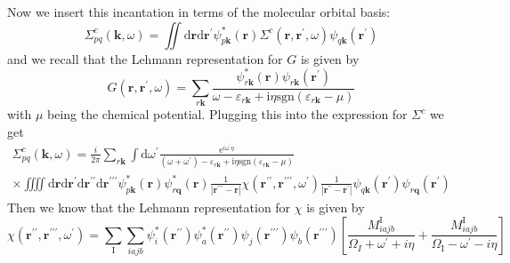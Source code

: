 \documentclass[12pt]{article}
\begin{document}
Now we insert this incantation in terms of the molecular orbital basis:
\begin{equation}
    \Sigma _{p q}^c\left(\mathbf{k}, \omega\right)= \iint \mathrm{d} \mathbf{r} \mathrm{d} \mathbf{r}^{\prime} \psi_{p\mathbf{k}}^{*}(\mathbf{r}) \Sigma^c\left(\mathbf{r}, \mathbf{r}^{\prime}, \omega\right) \psi_{q\mathbf{k}}(\mathbf{r}^{\prime})
\end{equation}
and we recall that the Lehmann representation for $G$ is given by
\begin{equation}
    G\left(\mathbf{r}, \mathbf{r}^{\prime}, \omega\right) = \sum_{r\mathbf{k}} \frac{\psi_{r\mathbf{k}}^{*}(\mathbf{r}) \psi_{r\mathbf{k}}(\mathbf{r}^{\prime})}{\omega - \varepsilon_{r\mathbf{k}} + \mathrm{i}\eta\text{sgn}(\varepsilon_{r\mathbf{k}} - \mu)}
\end{equation}
with $\mu$ being the chemical potential. Plugging this into the expression for $\Sigma^c$ we get
\begin{equation}
\begin{aligned}
    \Sigma _{p q}^c\left(\mathbf{k}, \omega\right)= \frac{i}{2\pi} \sum_{r\mathbf{k}} \int \mathrm{d} \omega^{\prime}  \frac{\mathrm{e}^{i \omega^{\prime}\eta}}{(\omega + \omega^{\prime}) - \varepsilon_{r\mathbf{k}} + \mathrm{i}\eta\text{sgn}(\varepsilon_{r\mathbf{k}} - \mu)}\\
\times \iiiint \mathrm{d} \mathbf{r} \mathrm{d} \mathbf{r}^{\prime} \mathrm{d} \mathbf{r}^{\prime \prime} \mathrm{d} \mathbf{r}^{\prime \prime \prime} \psi_{p\mathbf{k}}^{*}(\mathbf{r}) \psi_{r\mathbf{q}}^{*}(\mathbf{r}) \frac{1}{|\mathbf{r}^{\prime \prime \prime}-\mathbf{r}|} \chi(\mathbf{r}^{\prime \prime}, \mathbf{r}^{\prime \prime \prime}, \omega^{\prime}) \frac{1}{|\mathbf{r}^{\prime \prime}-\mathbf{r}^{\prime}|} \psi_{q\mathbf{k}}(\mathbf{r^\prime}) \psi_{r\mathbf{q}}(\mathbf{r}^\prime)
\end{aligned}
\end{equation}
Then we know that the Lehmann representation for $\chi$ is given by
\begin{equation}
    \chi(\mathbf{r}^{\prime \prime}, \mathbf{r}^{\prime \prime \prime}, \omega^{\prime}) =\sum_{\mathrm{I}} \sum_{i a j b} \psi_i^*(\mathbf{r}^{\prime \prime}) \psi_a^*(\mathbf{r}^{\prime \prime}) \psi_j\left(\mathbf{r}^{\prime \prime \prime}\right) \psi_b\left(\mathbf{r}^{\prime \prime \prime}\right)\left[\frac{M_{i a j b}^{\mathrm{I}}}{\Omega_I+\omega^{\prime}+i\eta}+\frac{M_{i a j b}^{\mathrm{I}}}{\Omega_{\mathrm{I}}-\omega^{\prime}-i\eta}\right]
\end{equation}
\end{document}
